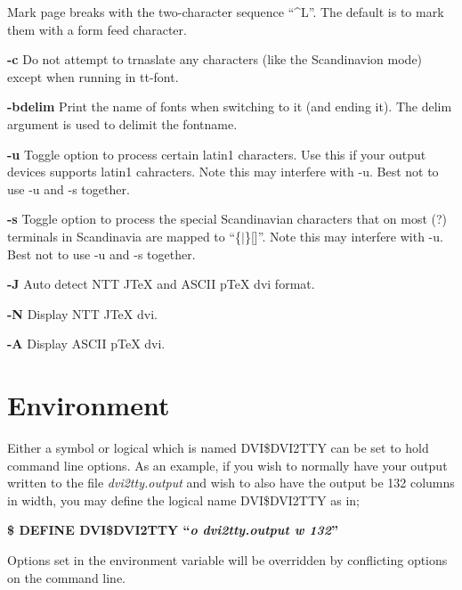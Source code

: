 \begin{list}{}{\setlength{\leftmargin}{0.6in}}
Mark page breaks with the two-character sequence ``\^{}L''. The default is
to mark them with a form feed character.
\item[{{\bf -c}}]
Do not attempt to trnaslate any characters (like the Scandinavion mode)
except when running in tt-font.
\item[{{\bf -bdelim}}]
Print the name of fonts when switching to it (and ending it). The delim
argument is used to delimit the fontname.
\item[{{\bf -u}}]
Toggle option to process certain latin1 characters. Use this if your output
devices supports latin1 cahracters.
Note this may interfere with -u. Best not to use -u and -s together.
\item[{{\bf -s}}]
Toggle option to process the special Scandinavian characters that on most (?)
terminals in Scandinavia are mapped to ``\{$|$\}[\bs ]''.
Note this may interfere with -u. Best not to use -u and -s together.
\item[{{\bf -J}}]
Auto detect NTT JTeX and ASCII pTeX dvi format.
\item[{{\bf -N}}]
Display NTT JTeX dvi.
\item[{{\bf -A}}]
Display ASCII pTeX dvi.
\end{list}
%
%
\section*{Environment}
%
%
%
%
Either a symbol or logical which is named DVI\$DVI2TTY can be set to hold
command line options.  As an example,  if you wish to normally have your
output written to the file {\it dvi2tty.output}\/ and wish to also have
the output be 132 columns in width,  you may define the logical name
DVI\$DVI2TTY as in;
\par\vspace{1.0\baselineskip}
\begin{center}
{\bf \$ DEFINE DVI\$DVI2TTY ``{\it o dvi2tty.output w 132}''}
\end{center}
\par\vspace{1.0\baselineskip}
Options set in the environment variable will be overridden by conflicting
options on the command line.

